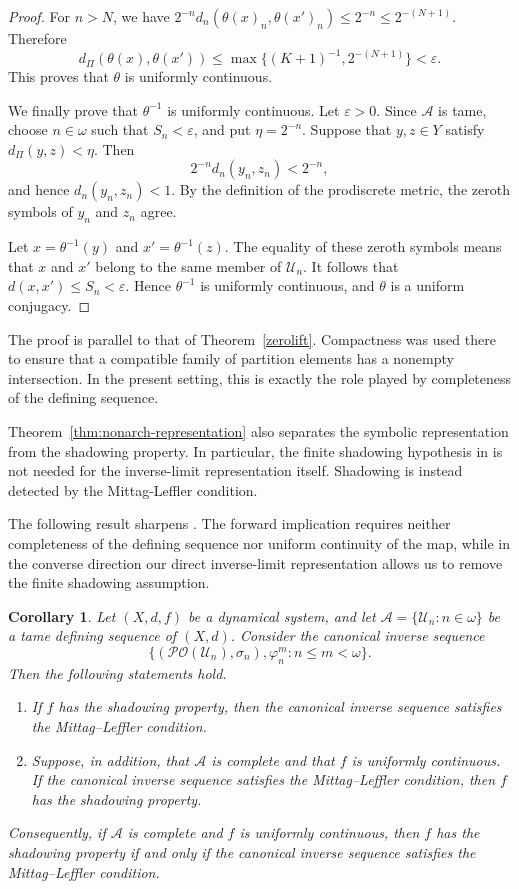 \documentclass[12pt]{amsart}
\newtheorem{corollary}[theorem]{Corollary}
\theoremstyle{definition}
\numberwithin{equation}{section}
\theoremstyle{remark}
\begin{document}
\begin{proof}
For $n>N$, we have
$2^{-n}d_n(\theta(x)_n,\theta(x')_n)\leq 2^{-n}\leq 2^{-(N+1)}$.
Therefore
\[
d_{\Pi}(\theta(x),\theta(x'))
\leq
\max\{(K+1)^{-1},2^{-(N+1)}\}
<\varepsilon.
\]
This proves that $\theta$ is uniformly continuous.

We finally prove that $\theta^{-1}$ is uniformly continuous. Let
$\varepsilon>0$. Since $\mathcal A$ is tame, choose $n\in\omega$ such
that $S_n<\varepsilon$, and put $\eta=2^{-n}$. Suppose that
$y,z\in Y$ satisfy $d_{\Pi}(y,z)<\eta$. Then
\[
2^{-n}d_n(y_n,z_n)<2^{-n},
\]
and hence $d_n(y_n,z_n)<1$. By the definition of the prodiscrete metric,
the zeroth symbols of $y_n$ and $z_n$ agree.

Let $x=\theta^{-1}(y)$ and $x'=\theta^{-1}(z)$. The equality of these
zeroth symbols means that $x$ and $x'$ belong to the same member of
$\mathcal U_n$. It follows that
$d(x,x')\leq S_n<\varepsilon$. Hence $\theta^{-1}$ is uniformly continuous,
and $\theta$ is a uniform conjugacy.
\end{proof}

The proof is parallel to that of Theorem~\ref{zerolift}. Compactness was used
there to ensure that a compatible family of partition elements has a
nonempty intersection. In the present setting, this is exactly the role
played by completeness of the defining sequence.

Theorem~\ref{thm:nonarch-representation} also separates the symbolic
representation from the shadowing property. In particular, the finite
shadowing hypothesis in \cite[Theorem~4.2.8]{Darji} is not needed for the
inverse-limit representation itself. Shadowing is instead detected by the
Mittag-Leffler condition.

The following result sharpens \cite[Theorem~4.2.9]{Darji}. The forward
implication requires neither completeness of the defining sequence nor
uniform continuity of the map, while in the converse direction our direct
inverse-limit representation allows us to remove the finite shadowing
assumption.

\begin{corollary}\label{cor:nonarch-ML}
Let $(X,d,f)$ be a dynamical system, and let
$\mathcal A=\{\mathcal U_n:n\in\omega\}$ be a tame defining sequence of
$(X,d)$. Consider the canonical inverse sequence
\[
\bigl\{(\mathcal{PO}(\mathcal U_n),\sigma_n),\varphi_n^m:
n\leq m<\omega\bigr\}.
\]
Then the following statements hold.
\begin{enumerate}
\item[(i)] If $f$ has the shadowing property, then the canonical inverse
sequence satisfies the Mittag--Leffler condition.

\item[(ii)] Suppose, in addition, that $\mathcal A$ is complete and that
$f$ is uniformly continuous. If the canonical inverse sequence satisfies
the Mittag--Leffler condition, then $f$ has the shadowing property.
\end{enumerate}

Consequently, if $\mathcal A$ is complete and $f$ is uniformly continuous,
then $f$ has the shadowing property if and only if the canonical inverse
sequence satisfies the Mittag--Leffler condition.
\end{corollary}
\end{document}
